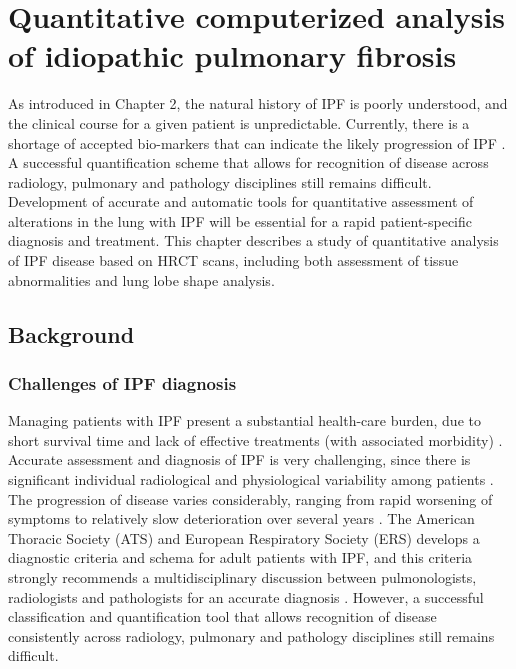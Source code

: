 \chapter{Quantitative computerized analysis of idiopathic pulmonary fibrosis} \label{Yuwen_QuantitiativeAnalysis}

As introduced in Chapter 2, the natural history of IPF is poorly understood, and the clinical course for a given patient is unpredictable. Currently, there is a shortage of accepted bio-markers that can indicate the likely progression of IPF \citep{bartholmai2013quantitative}. A successful quantification scheme that allows for recognition of disease across radiology, pulmonary and pathology disciplines still remains difficult. Development of accurate and automatic tools for quantitative assessment of alterations in the lung with IPF will be essential for a rapid patient-specific diagnosis and treatment. This chapter describes a study of quantitative analysis of IPF disease based on HRCT scans, including both assessment of tissue abnormalities and lung lobe shape analysis. 

\section{Background}
\subsection{Challenges of IPF diagnosis} \label{Challenge}
Managing patients with IPF present a substantial health-care burden, due to short survival time and lack of effective treatments (with associated morbidity) \citep{olson2007mortality,raghunath2014quantitative}. Accurate assessment and diagnosis of IPF is very challenging, since there is significant individual radiological and physiological variability among patients \citep{devaraj2014imaging}. The progression of disease varies considerably, ranging from rapid worsening of symptoms to relatively slow deterioration over several years \citep{king2011idiopathic,richeldi2017idiopathic}. The American Thoracic Society (ATS) and European Respiratory Society (ERS) develops a diagnostic criteria and schema for adult patients with IPF, and this criteria strongly recommends a multidisciplinary discussion between pulmonologists, radiologists and pathologists for an accurate diagnosis \citep{raghu2011official,travis2013official}. However, a successful classification and quantification tool that allows recognition of disease consistently across radiology, pulmonary and pathology disciplines still remains difficult. 

